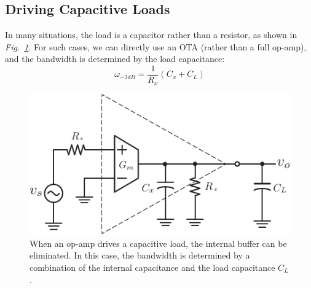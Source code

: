 \subsection{Driving Capacitive Loads}
In many situations, the load is a capacitor rather than a resistor, as shown in \emph{Fig.~\ref{fig:ota_amp_capload}}.  For such cases, we can directly use an OTA (rather than a full op-amp), and the bandwidth is determined by the load capacitance:
    \begin{equation}
        \omega_{-3dB} = \frac{1}{R_x}(C_x + C_L)
    \end{equation}
%
%
\begin{figure}[H]
\centering
\includegraphics[scale=1.15]{ota_amp_capload}
\caption{When an op-amp drives a capacitive load, the internal buffer can be eliminated.  In this case, the bandwidth is determined by a combination of the internal capacitance and the load capacitance $C_L$.}
\label{fig:ota_amp_capload}
\end{figure}
\newpage
